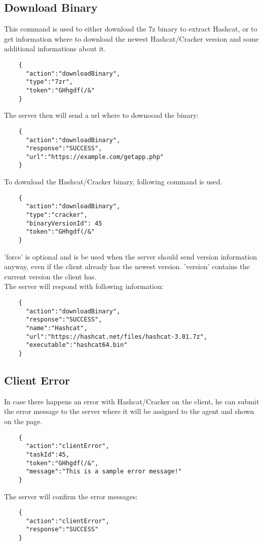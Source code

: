 \documentclass{article}
\begin{document}
	\subsection*{Download Binary}
	This command is used to either download the 7z binary to extract Hashcat, or to get information where to download the newest Hashcat/Cracker version and some additional informations about it.
	\begin{verbatim}
	{
	  "action":"downloadBinary",
	  "type":"7zr",
	  "token":"GHhgdf(/&"
	}
	\end{verbatim}
	The server then will send a url where to downooad the binary:
	\begin{verbatim}
	{
	  "action":"downloadBinary",
	  "response":"SUCCESS",
	  "url":"https://example.com/getapp.php"
	}
	\end{verbatim}
	To download the Hashcat/Cracker binary, following command is used.
	\begin{verbatim}
	{
	  "action":"downloadBinary",
	  "type":"cracker",
	  "binaryVersionId": 45
	  "token":"GHhgdf(/&"
	}
	\end{verbatim}
	'force' is optional and is be used when the server should send version information anyway, even if the client already has the newest version. 'version' contains the current version the client has.\\
	The server will respond with following information:
	\begin{verbatim}
	{
	  "action":"downloadBinary",
	  "response":"SUCCESS",
	  "name":"Hashcat",
	  "url":"https://hashcat.net/files/hashcat-3.01.7z",
	  "executable":"hashcat64.bin"
	}
	\end{verbatim}
	
	\subsection*{Client Error}
	In case there happens an error with Hashcat/Cracker on the client, he can submit the error message to the server where it will be assigned to the agent and shown on the page.
	\begin{verbatim}
	{
	  "action":"clientError",
	  "taskId":45,
	  "token":"GHhgdf(/&",
	  "message":"This is a sample error message!"
	}
	\end{verbatim}
	The server will confirm the error messages:
	\begin{verbatim}
	{
	  "action":"clientError",
	  "response":"SUCCESS"
	}
	\end{verbatim}
	
\end{document}
